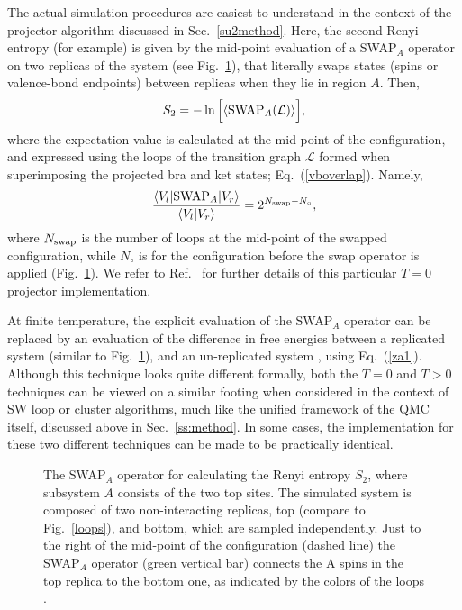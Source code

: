 \documentclass[range]{ar2e}
\begin{document}
The actual simulation procedures are easiest to understand in the context of the projector algorithm discussed in Sec.~\ref{su2method}.  Here, the second Renyi 
entropy (for example) is given by the  mid-point evaluation of a SWAP$_A$ operator on two replicas of the system (see Fig.~\ref{swap}), that literally swaps states 
(spins or valence-bond endpoints) between replicas when they lie in region $A$.  Then,
\begin{equation}
 S_2 = -\ln \Big[ \langle {\rm SWAP}_A (\mathcal{L})  \rangle \Big],
\end{equation}
where the expectation value is calculated at the mid-point of the configuration, and expressed using the loops of the transition graph  $\mathcal{L}$ formed when 
superimposing the projected bra and ket states; Eq.~(\ref{vboverlap}).  Namely,
\begin{equation}
\frac{\langle V_l| {\rm SWAP}_A | V_r\rangle}{\langle V_l| V_r\rangle} = 2^{N_{\rm swap} - N_\circ } ,
\end{equation} 
where $N_{\rm swap}$ is the number of loops at the mid-point of the swapped configuration, while $N_\circ$ is for the configuration before the swap operator 
is applied (Fig.~\ref{swap}). We refer to Ref.~\cite{Kallin11} for further details of this particular $T=0$ projector implementation.  

At finite temperature, the explicit evaluation 
of the SWAP$_A$ operator can be replaced by an evaluation of the difference in free energies between a replicated system (similar to Fig.~\ref{swap}), 
and an un-replicated system \cite{Melko10}, using Eq.~(\ref{za1}).  Although this technique looks quite different formally, both the $T=0$ and $T>0$ techniques 
can be viewed on a similar footing when considered in the context of SW loop or cluster algorithms, much like the unified framework of the QMC itself, discussed
above in Sec.~\ref{ss:method}. In some cases, the implementation for these two different techniques can be made to be practically identical.  

\begin{figure}
\centerline{}
\caption{The {\rm SWAP}$_A$ operator for calculating the Renyi entropy $S_2$, where subsystem $A$ consists of the two top sites. The simulated system is 
composed of two non-interacting replicas, top (compare to Fig.~\ref{loops}), and bottom, which are sampled independently. Just to the right of the mid-point 
of the configuration (dashed line) the {\rm SWAP}$_A$ operator (green vertical bar) connects the A spins in the top replica to the bottom one, as indicated by 
the colors of the loops \cite{Kallin11}.}
\label{swap}
\end{figure}
\end{document}
